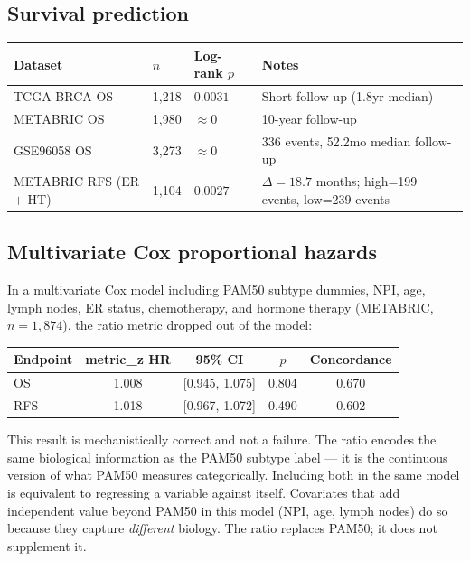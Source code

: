 \documentclass[12pt, a4paper]{article}
\begin{document}
\subsection{Survival prediction}

\begin{center}
\begin{tabular}{p{4cm}p{1.2cm}p{2cm}p{4.5cm}}
\toprule
\textbf{Dataset} & \textbf{$n$} & \textbf{Log-rank $p$}
& \textbf{Notes} \\
\midrule
TCGA-BRCA OS & 1,218 & $0.0031$
& Short follow-up (1.8yr median) \\
METABRIC OS & 1,980 & $\approx 0$
& 10-year follow-up \\
GSE96058 OS & 3,273 & $\approx 0$
& 336 events, 52.2mo median follow-up \\
METABRIC RFS (ER$+$ HT) & 1,104 & $0.0027$
& $\Delta = 18.7$ months; high=199 events,
  low=239 events \\
\bottomrule
\end{tabular}
\end{center}

\subsection{Multivariate Cox proportional hazards}

In a multivariate Cox model including PAM50 subtype dummies,
NPI, age, lymph nodes, ER status, chemotherapy, and hormone
therapy (METABRIC, $n=1{,}874$), the ratio metric dropped
out of the model:

\begin{center}
\begin{tabular}{lcccc}
\toprule
\textbf{Endpoint} & \textbf{metric\_z HR}
& \textbf{95\% CI} & \textbf{$p$}
& \textbf{Concordance} \\
\midrule
OS  & 1.008 & [0.945, 1.075] & 0.804 & 0.670 \\
RFS & 1.018 & [0.967, 1.072] & 0.490 & 0.602 \\
\bottomrule
\end{tabular}
\end{center}

\noindent This result is mechanistically correct and not a
failure. The ratio encodes the same biological information
as the PAM50 subtype label --- it is the continuous version
of what PAM50 measures categorically. Including both in the
same model is equivalent to regressing a variable against
itself. Covariates that add independent value beyond PAM50
in this model (NPI, age, lymph nodes) do so because they
capture \emph{different} biology. The ratio replaces PAM50;
it does not supplement it.
\end{document}

